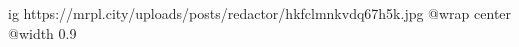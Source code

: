  
 
 
 
 

\ifcmt
  ig https://mrpl.city/uploads/posts/redactor/hkfclmnkvdq67h5k.jpg
  @wrap center
  @width 0.9
\fi
